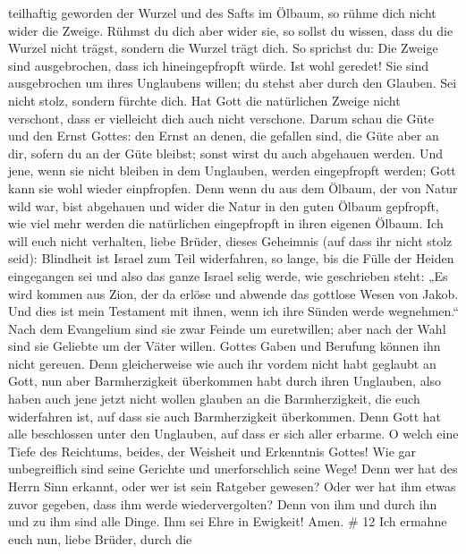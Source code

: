 teilhaftig geworden der Wurzel und des Safts im Ölbaum,  so
rühme dich nicht wider die Zweige. Rühmst du dich aber wider sie, so
sollst du wissen, dass du die Wurzel nicht trägst, sondern die Wurzel
trägt dich.  So sprichst du: Die Zweige sind ausgebrochen,
dass ich hineingepfropft würde.  Ist wohl geredet! Sie sind
ausgebrochen um ihres Unglaubens willen; du stehst aber durch den
Glauben. Sei nicht stolz, sondern fürchte dich.  Hat Gott
die natürlichen Zweige nicht verschont, dass er vielleicht dich auch
nicht verschone.  Darum schau die Güte und den Ernst
Gottes: den Ernst an denen, die gefallen sind, die Güte aber an dir,
sofern du an der Güte bleibst; sonst wirst du auch abgehauen werden.
 Und jene, wenn sie nicht bleiben in dem Unglauben, werden
eingepfropft werden; Gott kann sie wohl wieder einpfropfen.
 Denn wenn du aus dem Ölbaum, der von Natur wild war, bist
abgehauen und wider die Natur in den guten Ölbaum gepfropft, wie viel
mehr werden die natürlichen eingepfropft in ihren eigenen Ölbaum.
 Ich will euch nicht verhalten, liebe Brüder, dieses
Geheimnis (auf dass ihr nicht stolz seid): Blindheit ist Israel zum Teil
widerfahren, so lange, bis die Fülle der Heiden eingegangen sei
 und also das ganze Israel selig werde, wie geschrieben
steht: „Es wird kommen aus Zion, der da erlöse und abwende das gottlose
Wesen von Jakob.  Und dies ist mein Testament mit ihnen,
wenn ich ihre Sünden werde wegnehmen.``  Nach dem
Evangelium sind sie zwar Feinde um euretwillen; aber nach der Wahl sind
sie Geliebte um der Väter willen.  Gottes Gaben und
Berufung können ihn nicht gereuen.  Denn gleicherweise wie
auch ihr vordem nicht habt geglaubt an Gott, nun aber Barmherzigkeit
überkommen habt durch ihren Unglauben,  also haben auch
jene jetzt nicht wollen glauben an die Barmherzigkeit, die euch
widerfahren ist, auf dass sie auch Barmherzigkeit überkommen.
 Denn Gott hat alle beschlossen unter den Unglauben, auf
dass er sich aller erbarme.  O welch eine Tiefe des
Reichtums, beides, der Weisheit und Erkenntnis Gottes! Wie gar
unbegreiflich sind seine Gerichte und unerforschlich seine Wege!
 Denn wer hat des Herrn Sinn erkannt, oder wer ist sein
Ratgeber gewesen?  Oder wer hat ihm etwas zuvor gegeben,
dass ihm werde wiedervergolten?  Denn von ihm und durch ihn
und zu ihm sind alle Dinge. Ihm sei Ehre in Ewigkeit! Amen. \# 12
 Ich ermahne euch nun, liebe Brüder, durch die

